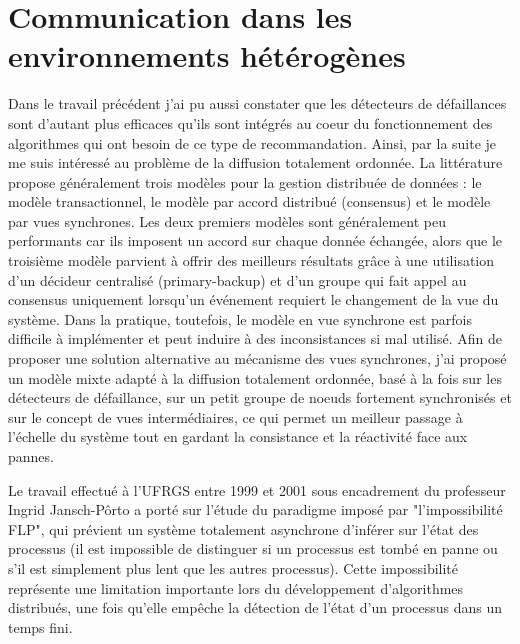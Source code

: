 \documentclass[a4paper]{book}
\begin{document}
\section{Communication dans les environnements hétérogènes}


Dans le travail précédent j'ai pu aussi constater que les détecteurs de défaillances sont d'autant plus efficaces qu'ils sont intégrés au coeur du fonctionnement des algorithmes qui ont besoin de ce type de recommandation. Ainsi, par la suite je me suis intéressé au problème de la diffusion totalement ordonnée. La littérature propose généralement trois modèles pour la gestion distribuée de données : le modèle transactionnel, le modèle par accord distribué (consensus) et le modèle par vues synchrones. Les deux premiers modèles sont généralement peu performants car ils imposent un accord sur chaque donnée échangée, alors que le troisième modèle parvient à offrir des meilleurs résultats grâce à une utilisation d'un décideur centralisé (primary-backup) et d'un groupe qui fait appel au consensus uniquement lorsqu'un événement requiert le changement de la vue du système. Dans la pratique, toutefois, le modèle en vue synchrone est parfois difficile à implémenter et peut induire à des inconsistances si mal utilisé. Afin de proposer une solution alternative au mécanisme des vues synchrones, j'ai proposé un modèle mixte adapté à la diffusion totalement ordonnée, basé à la fois sur les détecteurs de défaillance, sur un petit groupe de noeuds fortement synchronisés et sur le concept de vues intermédiaires, ce qui permet un meilleur passage à l'échelle du système tout en gardant la consistance et la réactivité face aux pannes.      


Le travail effectué à l'UFRGS entre 1999 et 2001 sous encadrement du professeur Ingrid Jansch-Pôrto a porté sur l'étude du paradigme imposé par "l'impossibilité FLP", qui prévient un système totalement asynchrone d'inférer sur l'état des processus (il est impossible de distinguer si un processus est tombé en panne ou s'il est simplement plus lent que les autres processus). Cette impossibilité représente une limitation importante lors du développement d'algorithmes distribués, une fois qu'elle empêche la détection de l'état d'un processus dans un temps fini.
\end{document}
